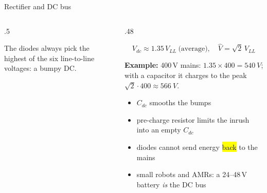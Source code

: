 \documentclass[aspectratio=169,10pt]{beamer}
\begin{document}
\begin{frame}{Rectifier and DC bus}
\begin{columns}[T]
\begin{column}{.5\textwidth}
\centering
{}
\small
The diodes always pick the highest of the six line-to-line voltages: a bumpy DC.
\end{column}
\begin{column}{.48\textwidth}
\small
\begin{eqbox}
\[ V_{dc}\approx1.35\,V_{LL}\ \text{(average)},\quad \hat V=\sqrt2\,V_{LL} \]
\end{eqbox}
\textbf{Example:} 400\,V mains: $1.35\times400=\SI{540}{V}$; with a capacitor it charges to the peak $\sqrt2\cdot400\approx\SI{566}{V}$.
\begin{itemize}\setlength\itemsep{.3mm}
\item $C_{dc}$ smooths the bumps
\item pre-charge resistor limits the inrush into an empty $C_{dc}$
\item diodes cannot send energy \hl{back} to the mains
\item small robots and AMRs: a 24--48\,V battery \emph{is} the DC bus
\end{itemize}
\end{column}
\end{columns}
\end{frame}
\end{document}
